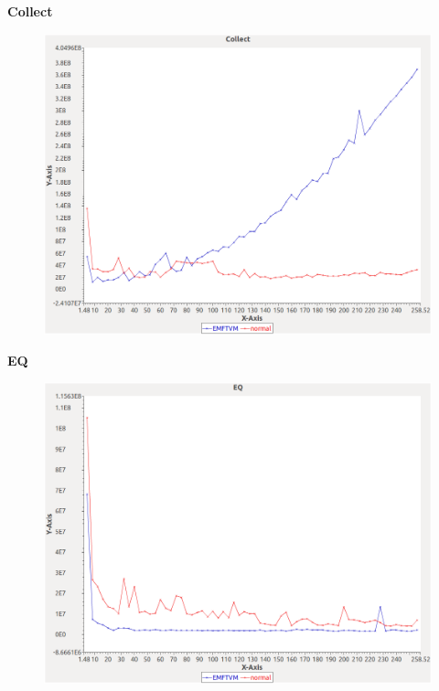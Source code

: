 \noindent\textbf{Collect}

\begin{figure}[h]
\centering
\includegraphics[width=\textwidth]{../graphs/orderedset/Collect}
\end{figure}
\pagebreak

\noindent\textbf{EQ}

\begin{figure}[h]
\centering
\includegraphics[width=\textwidth]{../graphs/orderedset/EQ}
\end{figure}
\pagebreak

